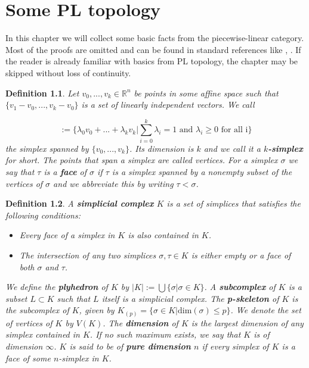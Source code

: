 \documentclass[11pt]{book}
\newtheorem{definition}{Definition}
\begin{document}
\tableofcontents

\chapter{Some PL topology}
\label{sec:Einleitung}

In this chapter we will collect some basic facts from the piecewise-linear category. Most of the proofs are omitted and can be found in standard references like \cite{pltopo}, \cite{hatcher}. If the reader is already familiar with basics from PL topology, the chapter may be skipped without loss of continuity.

\begin{definition}
Let $v_0,...,v_k \in \mathbb{R}^n$ be points in some affine space such that $\{ v_1-v_0,...,v_k-v_0 \}$ is a set of linearly independent vectors. We call

\begin{equation*}
[v_0,...,v_k] := \Biggl \{  \lambda_0v_0+...+ \lambda_kv_k \Bigg |  \sum_{i=0}^k \lambda_i =1 \text{ and } \lambda_i \geq 0 \text{ for all i} \Biggr \}
\end{equation*}
the simplex spanned by $\{v_0,...,v_k \}$. Its dimension is $k$ and we call it a \textbf{$k$-simplex} for short. The points that span a simplex are called vertices. For a simplex $\sigma$ we say that $\tau$ is a \textbf{face} of $\sigma$ if $\tau$ is a simplex spanned by a nonempty subset of the vertices of $\sigma$ and we abbreviate this by writing $\tau < \sigma$.
\end{definition}

\begin{definition}
A \textbf{simplicial complex} $K$ is a set of simplices that satisfies the following conditions:

\begin{itemize}
\item Every face of a simplex in $K$ is also contained in $K$.
\item The intersection of any two simplices $\sigma, \tau \in K$ is either empty or a face of both $\sigma$ and $\tau$.
\end{itemize}

We define the \textbf{plyhedron} of $K$ by $|K|:= \bigcup \{ \sigma | \sigma \in K \}$. A \textbf{subcomplex} of $K$ is a subset $L \subset K$ such that $L$ itself is a simplicial complex. The \textbf{p-skeleton} of $K$ is the subcomplex of $K$, given by $K_{(p)}= \{ \sigma \in  K | \text{dim}(\sigma) \leq p \}$. We denote the set of vertices of $K$ by $V(K)$. The \textbf{dimension} of $K$ is the largest dimension of any simplex contained in $K$. If no such maximum exists, we say that $K$ is of dimension $\infty$. $K$ is said to be of \textbf{pure dimension} $n$ if every simplex of $K$ is a face of some $n$-simplex in $K$.
\end{definition}
\end{document}
